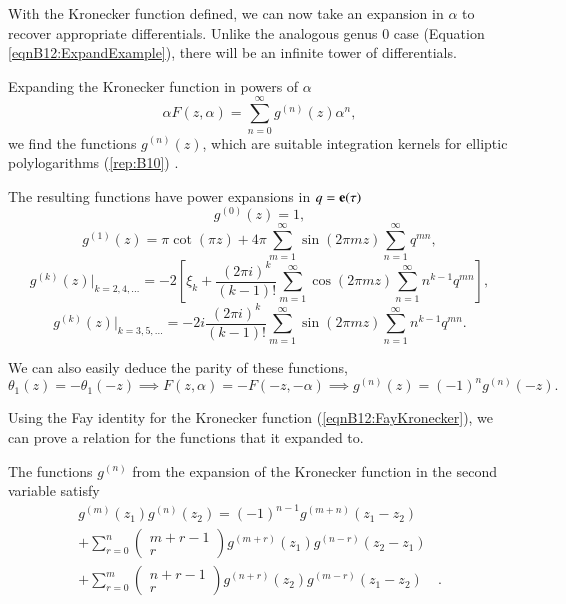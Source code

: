 With the Kronecker function defined, we can now take an expansion in $\alpha$ to recover appropriate differentials. Unlike the analogous genus 0 case (Equation \ref{eqnB12:ExpandExample}), there will be an infinite tower of differentials.

\begin{definition}
    Expanding the Kronecker function in powers of $\alpha$
    \begin{equation}
        \alpha F(z,\alpha) = \sum_{n=0}^{\infty} g^{(n)}(z) \alpha^n,
    \end{equation}
    we find the functions $g^{(n)}(z)$, which are suitable integration kernels for elliptic polylogarithms (\ref{rep:B10}) \cite{Broedel_2022}.
\end{definition}

The resulting functions have power expansions in $q = \mathbf{e}(\tau)$ \cite{Broedel_2015}
\begin{equation}
    g^{(0)}(z) = 1,
\end{equation}
\begin{equation}
    g^{(1)}(z) = \pi \cot(\pi z) + 4 \pi \sum_{m=1}^\infty \sin(2 \pi m z) \sum_{n=1}^\infty q^{mn},
\end{equation}
\begin{equation}
    g^{(k)}(z)\big|_{k=2,4,\ldots} = -2\left[\xi_k + \frac{(2\pi i)^k}{(k-1)!} \sum_{m=1}^\infty \cos(2 \pi m z) \sum_{n=1}^\infty n^{k-1} q^{mn} \right],
\end{equation}
\begin{equation}
    g^{(k)}(z)\big|_{k=3,5,\ldots} = -2i \frac{(2\pi i)^k}{(k-1)!} \sum_{m=1}^\infty \sin(2\pi mz) \sum_{n=1}^\infty n^{k-1} q^{mn}.
\end{equation}

We can also easily deduce the parity of these functions,
\begin{equation}
    \theta_1(z) = -\theta_1(-z) \implies F(z,\alpha) = -F(-z,-\alpha) \implies g^{(n)}(z)=(-1)^n g^{(n)}(-z).
\end{equation}


Using the Fay identity for the Kronecker function (\ref{eqnB12:FayKronecker}), we can prove a relation for the functions that it expanded to.

\begin{lemma}
    The functions $g^{(n)}$ from the expansion of the Kronecker function in the second variable satisfy
    \begin{align}
        g^{(m)}(z_1) g^{(n)}(z_2) = (-1)^{n-1} g^{(m+n)}(z_1-z_2)& \\
         +\sum_{r=0}^n \begin{pmatrix} m+r-1 \\ r \end{pmatrix} g^{(m+r)}(z_1) g^{(n-r)}(z_2-z_1) & \\
         +\sum_{r=0}^m \begin{pmatrix} n+r-1 \\ r \end{pmatrix} g^{(n+r)}(z_2) g^{(m-r)}(z_1-z_2) & .
    \end{align}
\end{lemma}

